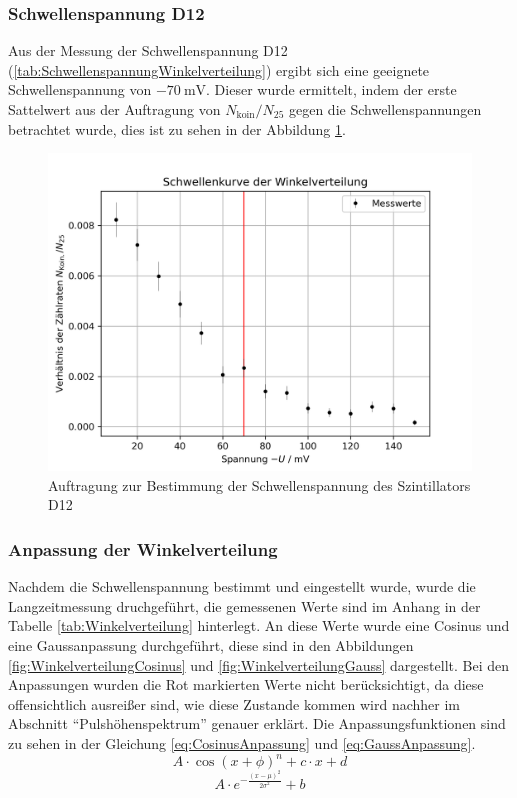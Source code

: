 \documentclass{article}
\begin{document}
\subsubsection*{Schwellenspannung D12}
Aus der Messung der Schwellenspannung D12 (\ref{tab:SchwellenspannungWinkelverteilung}) ergibt sich eine geeignete Schwellenspannung von $\SI{-70}{\milli\volt}$.
Dieser wurde ermittelt, indem der erste Sattelwert aus der Auftragung von $N_\text{koin}/N_{25}$ gegen die Schwellenspannungen betrachtet wurde, 
dies ist zu sehen in der Abbildung \ref{fig:SchwellenspannungWinkelverteilung}.
\begin{figure}[H]
    \centering
    \includegraphics[width=1\textwidth]{figures/Schwellenspannung_Winkelverteilung.png}
    \caption{Auftragung zur Bestimmung der Schwellenspannung des Szintillators D12}
    \label{fig:SchwellenspannungWinkelverteilung}
\end{figure}
\subsubsection*{Anpassung der Winkelverteilung}
Nachdem die Schwellenspannung bestimmt und eingestellt wurde, wurde die Langzeitmessung druchgeführt, die gemessenen Werte sind im Anhang in der Tabelle \ref{tab:Winkelverteilung} hinterlegt.
An diese Werte wurde eine Cosinus und eine Gaussanpassung durchgeführt, diese sind in den Abbildungen \ref{fig:WinkelverteilungCosinus} und \ref{fig:WinkelverteilungGauss} dargestellt.
Bei den Anpassungen wurden die Rot markierten Werte nicht berücksichtigt, da diese offensichtlich ausreißer sind, wie diese Zustande kommen wird nachher im Abschnitt \enquote{Pulshöhenspektrum} genauer erklärt.
Die Anpassungsfunktionen sind zu sehen in der Gleichung \ref{eq:CosinusAnpassung} und \ref{eq:GaussAnpassung}.
\begin{displaymath}
    A \cdot \cos( x + \phi )^n + c \cdot x + d
\label{eq:CosinusAnpassung}
\end{displaymath}
\begin{displaymath}
    A \cdot e^{-\frac{(x - \mu)^2}{2\sigma^2}} + b
\label{eq:GaussAnpassung}
\end{displaymath}
\end{document}
